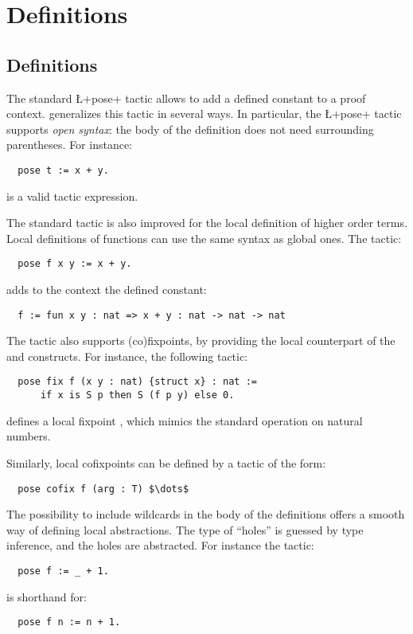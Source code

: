 \section{Definitions}

\subsection{Definitions}\label{ssec:pose}

The standard \L+pose+ tactic allows to add a defined constant to a
proof context. \ssr{} generalizes this tactic in several ways.
In particular, the \ssr{} \L+pose+ tactic supports \emph{open syntax}:
the body of
the definition does not need surrounding parentheses. For instance:
\begin{lstlisting}
  pose t := x + y.
\end{lstlisting}
is a valid tactic expression.

The standard  tactic is also improved for the
local definition of higher order terms.
Local definitions of functions can use the same syntax as
global ones. The tactic:
\begin{lstlisting}
  pose f x y := x + y.
\end{lstlisting}
adds to the context the defined constant:
\begin{lstlisting}
  f := fun x y : nat => x + y : nat -> nat -> nat
\end{lstlisting}

The \ssr{}  tactic also supports (co)fixpoints,
by providing the local counterpart of the
 and  constructs.
For instance, the following tactic:
\begin{lstlisting}
  pose fix f (x y : nat) {struct x} : nat :=
      if x is S p then S (f p y) else 0.
\end{lstlisting}
defines a local fixpoint , which mimics the standard 
operation on natural numbers.

Similarly, local cofixpoints can be defined by a tactic of the form:
\begin{lstlisting}
  pose cofix f (arg : T) $\dots$
\end{lstlisting}

The possibility to include wildcards in the body of the definitions
 offers a smooth
way of defining local abstractions. The type of ``holes'' is
guessed by type inference, and the holes are abstracted.
For instance the tactic:
\begin{lstlisting}
  pose f := _ + 1.
\end{lstlisting}
is shorthand for:
\begin{lstlisting}
  pose f n := n + 1.
\end{lstlisting}


